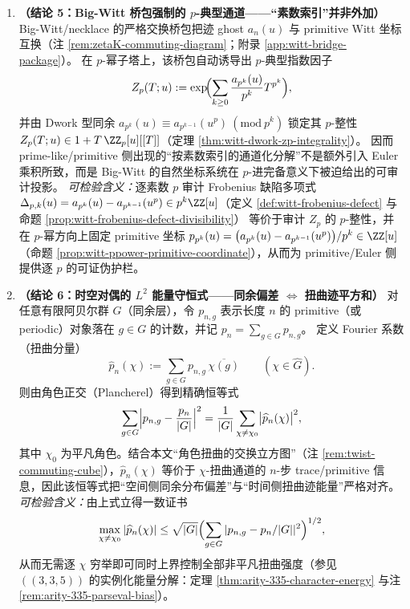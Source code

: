 \begin{enumerate}
  \item \textbf{（结论 5：Big-Witt 桥包强制的 \texorpdfstring{$p$}{p}-典型通道——“素数索引”并非外加）}
  Big-Witt/necklace 的严格交换桥包把迹 ghost \(a_n(u)\) 与 primitive Witt 坐标互换（注 \ref{rem:zetaK-commuting-diagram}；附录 \ref{app:witt-bridge-package}）。
  在 \(p\)-幂子塔上，该桥包自动诱导出 \(p\)-典型指数因子
  \[
  Z_p(T;u):=\exp\!\Bigl(\sum_{k\ge 0}\frac{a_{p^k}(u)}{p^k}T^{p^k}\Bigr),
  \]
  并由 Dwork 型同余 \(a_{p^k}(u)\equiv a_{p^{k-1}}(u^p)\ (\mathrm{mod}\ p^k)\) 锁定其 \(p\)-整性 \(Z_p(T;u)\in 1+T\,\ZZ_p[u][[T]]\)（定理 \ref{thm:witt-dwork-zp-integrality}）。
  因而 prime-like/primitive 侧出现的“按素数索引的通道化分解”不是额外引入 Euler 乘积所致，而是 Big-Witt 的自然坐标系统在 \(p\)-进完备意义下被迫给出的可审计投影。
  \emph{可检验含义：}逐素数 \(p\) 审计 Frobenius 缺陷多项式
  \(\Delta_{p,k}(u)=a_{p^k}(u)-a_{p^{k-1}}(u^p)\in p^k\ZZ[u]\)（定义 \ref{def:witt-frobenius-defect} 与命题 \ref{prop:witt-frobenius-defect-divisibility}）
  等价于审计 \(Z_p\) 的 \(p\)-整性，并在 \(p\)-幂方向上固定 primitive 坐标
  \(p_{p^k}(u)=\bigl(a_{p^k}(u)-a_{p^{k-1}}(u^p)\bigr)/p^k\in\ZZ[u]\)（命题 \ref{prop:witt-ppower-primitive-coordinate}），从而为 primitive/Euler 侧提供逐 \(p\) 的可证伪护栏。

  \item \textbf{（结论 6：时空对偶的 \texorpdfstring{$L^2$}{L2} 能量守恒式——同余偏差 \texorpdfstring{$\Leftrightarrow$}{<->} 扭曲迹平方和）}
  对任意有限阿贝尔群 \(G\)（同余层），令 \(p_{n,g}\) 表示长度 \(n\) 的 primitive（或 periodic）对象落在 \(g\in G\) 的计数，并记 \(p_n=\sum_{g\in G}p_{n,g}\)。
  定义 Fourier 系数（扭曲分量）
  \[
  \widehat p_n(\chi):=\sum_{g\in G} p_{n,g}\,\overline{\chi(g)}\qquad(\chi\in\widehat G).
  \]
  则由角色正交（Plancherel）得到精确恒等式
  \[
  \sum_{g\in G}\Bigl|p_{n,g}-\frac{p_n}{|G|}\Bigr|^2
  =\frac{1}{|G|}\sum_{\chi\neq \chi_0}\bigl|\widehat p_n(\chi)\bigr|^2,
  \]
  其中 \(\chi_0\) 为平凡角色。结合本文“角色扭曲的交换立方图”（注 \ref{rem:twist-commuting-cube}），\(\widehat p_n(\chi)\) 等价于 \(\chi\)-扭曲通道的 \(n\)-步 trace/primitive 信息，因此该恒等式把“空间侧同余分布偏差”与“时间侧扭曲迹能量”严格对齐。
  \emph{可检验含义：}由上式立得一数证书
  \[
  \max_{\chi\neq \chi_0}|\widehat p_n(\chi)|
  \le \sqrt{|G|}\Bigl(\sum_{g\in G}|p_{n,g}-p_n/|G||^2\Bigr)^{1/2},
  \]
  从而无需逐 \(\chi\) 穷举即可同时上界控制全部非平凡扭曲强度（参见 \(((3,3,5))\) 的实例化能量分解：定理 \ref{thm:arity-335-character-energy} 与注 \ref{rem:arity-335-parseval-bias}）。


\end{enumerate}
